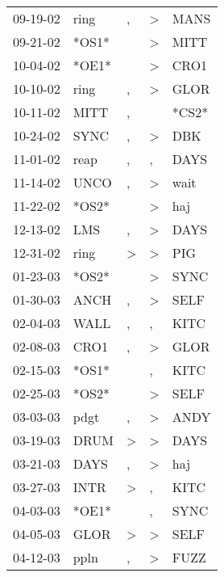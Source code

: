 \begin{supertabular}{lllll}
 09-19-02 &   ring &                , &     \textgreater &   MANS \\
 09-21-02 &  *OS1* &                  &     \textgreater &   MITT \\
 10-04-02 &  *OE1* &                  &     \textgreater &   CRO1 \\
 10-10-02 &   ring &                , &     \textgreater &   GLOR \\
 10-11-02 &   MITT &                , &                  &  *CS2* \\
 10-24-02 &   SYNC &                , &     \textgreater &    DBK \\
 11-01-02 &   reap &                , &                , &   DAYS \\
 11-14-02 &   UNCO &                , &     \textgreater &   wait \\
 11-22-02 &  *OS2* &                  &     \textgreater &    haj \\
 12-13-02 &    LMS &                , &     \textgreater &   DAYS \\
 12-31-02 &   ring &     \textgreater &     \textgreater &    PIG \\
 01-23-03 &  *OS2* &                  &     \textgreater &   SYNC \\
 01-30-03 &   ANCH &                , &     \textgreater &   SELF \\
 02-04-03 &   WALL &                , &                , &   KITC \\
 02-08-03 &   CRO1 &                , &     \textgreater &   GLOR \\
 02-15-03 &  *OS1* &                  &                , &   KITC \\
 02-25-03 &  *OS2* &                  &     \textgreater &   SELF \\
 03-03-03 &   pdgt &                , &     \textgreater &   ANDY \\
 03-19-03 &   DRUM &     \textgreater &     \textgreater &   DAYS \\
 03-21-03 &   DAYS &                , &     \textgreater &    haj \\
 03-27-03 &   INTR &     \textgreater &                , &   KITC \\
 04-03-03 &  *OE1* &                  &                , &   SYNC \\
 04-05-03 &   GLOR &     \textgreater &     \textgreater &   SELF \\
 04-12-03 &   ppln &                , &     \textgreater &   FUZZ \\

\end{supertabular}
